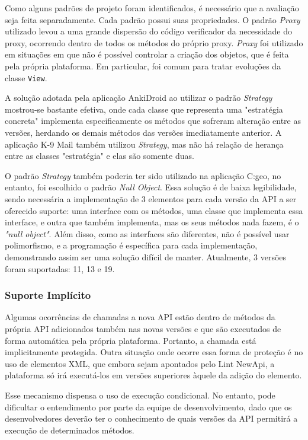Como alguns padrões de projeto foram identificados, é necessário que a avaliação
seja feita separadamente. Cada padrão possui suas propriedades. O padrão
\textit{Proxy} utilizado levou a uma grande dispersão do código verificador da
necessidade do proxy, ocorrendo dentro de todos os métodos do próprio proxy.
\textit{Proxy} foi utilizado em situações em que não é possível controlar a criação
dos objetos, que é feita pela própria plataforma. Em particular, foi comum para
tratar evoluções da classe \texttt{View}.

A solução adotada pela aplicação AnkiDroid ao utilizar o padrão \textit{Strategy}
mostrou-se bastante efetiva, onde cada classe que representa uma "estratégia concreta"
implementa especificamente os métodos que sofreram alteração entre as versões, herdando
os demais métodos das versões imediatamente anterior. A aplicação K-9 Mail também utilizou
\textit{Strategy}, mas não há relação de herança entre as classes "estratégia" e elas são
somente duas.

O padrão \textit{Strategy} também poderia ter sido utilizado na aplicação C:geo,
no entanto, foi escolhido o padrão \textit{Null Object}. Essa solução é de baixa
legibilidade, sendo necessária a implementação de 3 elementos para cada versão da
API a ser oferecido suporte: uma interface com os métodos, uma classe que implementa
essa interface, e outra que também implementa, mas os seus métodos nada fazem, é o
\textit{"null object"}. Além disso, como as interfaces são diferentes, não é possível
usar polimorfismo, e a programação é específica para cada implementação, demonstrando
assim ser uma solução difícil de manter. Atualmente, 3 versões foram suportadas:
11, 13 e 19.

\subsubsection{Suporte Implícito}

Algumas ocorrências de chamadas a nova API estão dentro de métodos da própria API
adicionados também nas novas versões e que são executados de forma automática pela
própria plataforma. Portanto, a chamada está implicitamente protegida. Outra situação
onde ocorre essa forma de proteção é no uso de elementos XML, que embora sejam apontados
pelo Lint NewApi, a plataforma só irá executá-los em versões superiores àquele da adição
do elemento. 

Esse mecanismo dispensa o uso de execução condicional. No entanto, pode dificultar o
entendimento por parte da equipe de desenvolvimento, dado que os desenvolvedores deverão
ter o conhecimento de quais versões da API permitirá a execução de determinados métodos.

